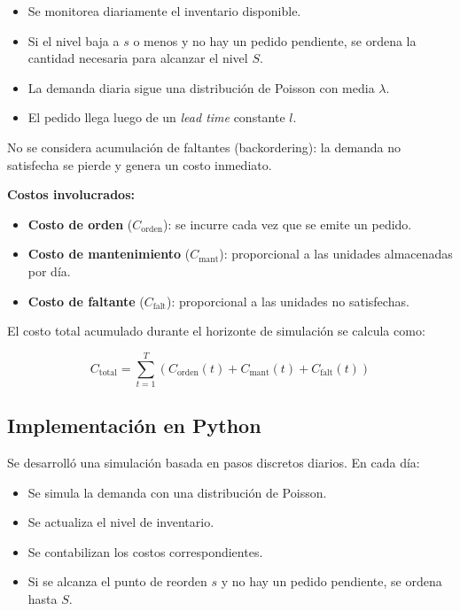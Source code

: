 \documentclass[12pt]{article}
\begin{document}
\begin{itemize}
    \item Se monitorea diariamente el inventario disponible.
    \item Si el nivel baja a $s$ o menos y no hay un pedido pendiente, se ordena la cantidad necesaria para alcanzar el nivel $S$.
    \item La demanda diaria sigue una distribución de Poisson con media \( \lambda \).
    \item El pedido llega luego de un \textit{lead time} constante \( l \).
\end{itemize}

No se considera acumulación de faltantes (backordering): la demanda no satisfecha se pierde y genera un costo inmediato.

\textbf{Costos involucrados:}
\begin{itemize}
    \item \textbf{Costo de orden} ($C_{\text{orden}}$): se incurre cada vez que se emite un pedido.
    \item \textbf{Costo de mantenimiento} ($C_{\text{mant}}$): proporcional a las unidades almacenadas por día.
    \item \textbf{Costo de faltante} ($C_{\text{falt}}$): proporcional a las unidades no satisfechas.
\end{itemize}

El costo total acumulado durante el horizonte de simulación se calcula como:

\[
C_{\text{total}} = \sum_{t=1}^{T} \left( C_{\text{orden}}(t) + C_{\text{mant}}(t) + C_{\text{falt}}(t) \right)
\]


\subsection{Implementación en Python}

Se desarrolló una simulación basada en pasos discretos diarios. En cada día:
\begin{itemize}
    \item Se simula la demanda con una distribución de Poisson.
    \item Se actualiza el nivel de inventario.
    \item Se contabilizan los costos correspondientes.
    \item Si se alcanza el punto de reorden $s$ y no hay un pedido pendiente, se ordena hasta $S$.
\end{itemize}
\end{document}
